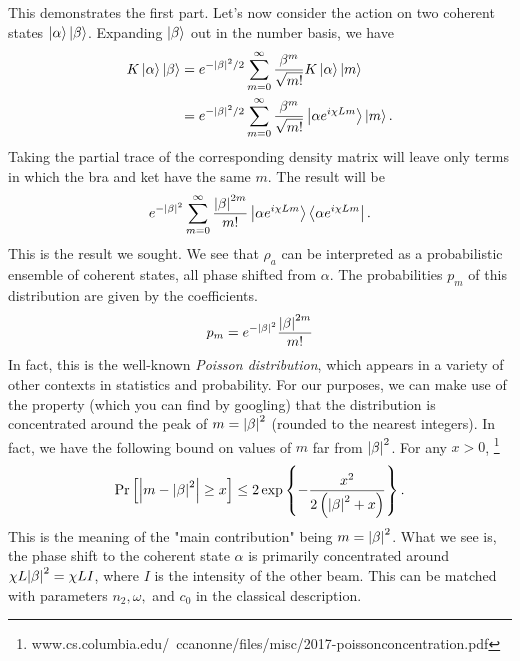\documentclass{book}
\begin{document}
    This demonstrates the first part. Let's now consider the action on two coherent states $\ket{\alpha}\ket{\beta}$. Expanding $\ket{\beta}$ out in the number basis, we have
    \begin{align}
    \begin{aligned}
        K \ket{\alpha}\ket{\beta} &= e^{-\abs{\beta}^2/2} \sum_{m=0}^\infty \frac{\beta^m}{\sqrt{m!}} K \ket{\alpha}\ket{m} \\
        &= e^{-\abs{\beta}^2/2} \sum_{m=0}^\infty \frac{\beta^m}{\sqrt{m!}} \ket{\alpha e^{i \chi L m}}\ket{m}.
    \end{aligned}
    \end{align}
    Taking the partial trace of the corresponding density matrix will leave only terms in which the bra and ket have the same $m$. The result will be 
    \begin{align}
        e^{-\abs{\beta}^2} \sum_{m=0}^\infty \frac{\abs{\beta}^{2m}}{m!} \ket{\alpha e^{i \chi L m}} \bra{\alpha e^{i \chi L m}}.
    \end{align}
    This is the result we sought. We see that $\rho_a$ can be interpreted as a probabilistic ensemble of coherent states, all phase shifted from $\alpha$. The probabilities $p_m$ of this distribution are given by the coefficients.
    \begin{align}
        p_m = e^{-\abs{\beta}^2} \frac{\abs{\beta}^{2m}}{m!}
    \end{align}
    In fact, this is the well-known \emph{Poisson distribution}, which appears in a variety of other contexts in statistics and probability. For our purposes, we can make use of the property (which you can find by googling) that the distribution is concentrated around the peak of $m = \abs{\beta}^2$ (rounded to the nearest integers). In fact, we have the following bound on values of $m$ far from $\abs{\beta}^2$. For any $x > 0$, \footnote{www.cs.columbia.edu/~ccanonne/files/misc/2017-poissonconcentration.pdf}
    \begin{align}
        \Pr\left[\abs{m - \abs{\beta}^2} \geq x \right] \leq 2 \exp\left\{-\frac{x^2}{2\left(\abs{\beta}^2 + x\right)}\right\}.
    \end{align}
    This is the meaning of the "main contribution" being $m = \abs{\beta}^2$. What we see is, the phase shift to the coherent state $\alpha$ is primarily concentrated around $\chi L \abs{\beta}^2 = \chi L I$, where $I$ is the intensity of the other beam. This can be matched with parameters $n_2, \omega,$ and $c_0$ in the classical description.
\end{document}
